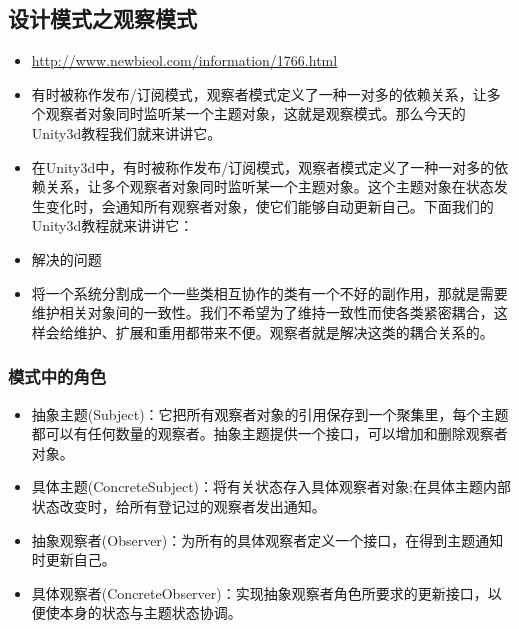 \documentclass[9pt, b5paper]{article}
\begin{document}
\subsection{设计模式之观察模式}
\label{sec:orgae7a773}
\begin{itemize}
\item \url{http://www.newbieol.com/information/1766.html}
\item 有时被称作发布/订阅模式，观察者模式定义了一种一对多的依赖关系，让多个观察者对象同时监听某一个主题对象，这就是观察模式。那么今天的Unity3d教程我们就来讲讲它。
\item 在Unity3d中，有时被称作发布/订阅模式，观察者模式定义了一种一对多的依赖关系，让多个观察者对象同时监听某一个主题对象。这个主题对象在状态发生变化时，会通知所有观察者对象，使它们能够自动更新自己。下面我们的Unity3d教程就来讲讲它：
\item 解决的问题
\item 将一个系统分割成一个一些类相互协作的类有一个不好的副作用，那就是需要维护相关对象间的一致性。我们不希望为了维持一致性而使各类紧密耦合，这样会给维护、扩展和重用都带来不便。观察者就是解决这类的耦合关系的。
\end{itemize}
\subsubsection{模式中的角色}
\label{sec:org0cae48c}
\begin{itemize}
\item 抽象主题(Subject)：它把所有观察者对象的引用保存到一个聚集里，每个主题都可以有任何数量的观察者。抽象主题提供一个接口，可以增加和删除观察者对象。
\item 具体主题(ConcreteSubject)：将有关状态存入具体观察者对象;在具体主题内部状态改变时，给所有登记过的观察者发出通知。
\item 抽象观察者(Observer)：为所有的具体观察者定义一个接口，在得到主题通知时更新自己。
\item 具体观察者(ConcreteObserver)：实现抽象观察者角色所要求的更新接口，以便使本身的状态与主题状态协调。
\end{itemize}
\end{document}
